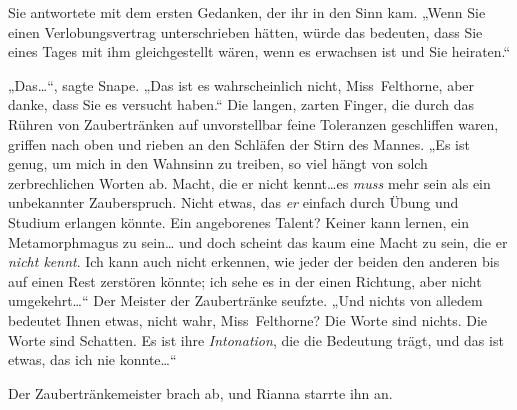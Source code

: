 Sie antwortete mit dem ersten Gedanken, der ihr in den Sinn kam. „Wenn Sie einen Verlobungsvertrag unterschrieben hätten, würde das bedeuten, dass Sie eines Tages mit ihm gleichgestellt wären, wenn es erwachsen ist und Sie heiraten.“

„Das…“, sagte Snape. „Das ist es wahrscheinlich nicht, Miss~Felthorne, aber danke, dass Sie es versucht haben.“ Die langen, zarten Finger, die durch das Rühren von Zaubertränken auf unvorstellbar feine Toleranzen geschliffen waren, griffen nach oben und rieben an den Schläfen der Stirn des Mannes. „Es ist genug, um mich in den Wahnsinn zu treiben, so viel hängt von solch zerbrechlichen Worten ab. Macht, die er nicht kennt…es \emph{muss} mehr sein als ein unbekannter Zauberspruch. Nicht etwas, das \emph{er} einfach durch Übung und Studium erlangen könnte. Ein angeborenes Talent? Keiner kann lernen, ein Metamorphmagus zu sein… und doch scheint das kaum eine Macht zu sein, die er \emph{nicht kennt}. Ich kann auch nicht erkennen, wie jeder der beiden den anderen bis auf einen Rest zerstören könnte; ich sehe es in der einen Richtung, aber nicht umgekehrt…“ Der Meister der Zaubertränke seufzte. „Und nichts von alledem bedeutet Ihnen etwas, nicht wahr, Miss~Felthorne? Die Worte sind nichts. Die Worte sind Schatten. Es ist ihre \emph{Intonation}, die die Bedeutung trägt, und das ist etwas, das ich nie konnte…“

Der Zaubertränkemeister brach ab, und Rianna starrte ihn an.

